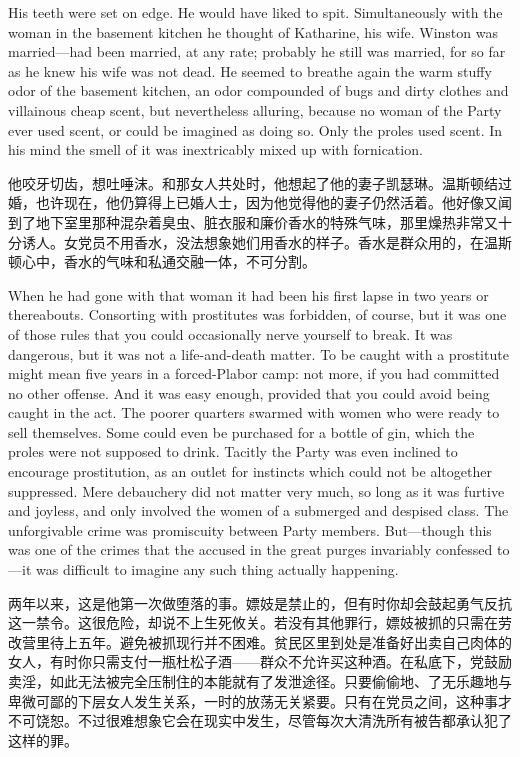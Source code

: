 \begin{paracol}{2}
\switchcolumn*

His teeth were set on edge. He would have liked to spit. Simultaneously
with the woman in the basement kitchen he thought of Katharine, his
wife. Winston was married---had been married, at any rate; probably he
still was married, for so far as he knew his wife was not dead. He
seemed to breathe again the warm stuffy odor of the basement kitchen, an
odor compounded of bugs and dirty clothes and villainous cheap scent,
but nevertheless alluring, because no woman of the Party ever used
scent, or could be imagined as doing so. Only the proles used scent. In
his mind the smell of it was inextricably mixed up with fornication.

\switchcolumn

他咬牙切齿，想吐唾沫。和那女人共处时，他想起了他的妻子凯瑟琳。温斯顿结过婚，也许现在，他仍算得上已婚人士，因为他觉得他的妻子仍然活着。他好像又闻到了地下室里那种混杂着臭虫、脏衣服和廉价香水的特殊气味，那里燥热非常又十分诱人。女党员不用香水，没法想象她们用香水的样子。香水是群众用的，在温斯顿心中，香水的气味和私通交融一体，不可分割。

\switchcolumn*

When he had gone with that woman it had been his first lapse in two
years or thereabouts. Consorting with prostitutes was forbidden, of
course, but it was one of those rules that you could occasionally nerve
yourself to break. It was dangerous, but it was not a life-and-death
matter. To be caught with a prostitute might mean five years in a
forced-Plabor camp: not more, if you had committed no other offense. And
it was easy enough, provided that you could avoid being caught in the
act. The poorer quarters swarmed with women who were ready to sell
themselves. Some could even be purchased for a bottle of gin, which the
proles were not supposed to drink. Tacitly the Party was even inclined
to encourage prostitution, as an outlet for instincts which could not be
altogether suppressed. Mere debauchery did not matter very much, so long
as it was furtive and joyless, and only involved the women of a
submerged and despised class. The unforgivable crime was promiscuity
between Party members. But---though this was one of the crimes that the
accused in the great purges invariably confessed to---it was difficult
to imagine any such thing actually happening.

\switchcolumn

两年以来，这是他第一次做堕落的事。嫖妓是禁止的，但有时你却会鼓起勇气反抗这一禁令。这很危险，却说不上生死攸关。若没有其他罪行，嫖妓被抓的只需在劳改营里待上五年。避免被抓现行并不困难。贫民区里到处是准备好出卖自己肉体的女人，有时你只需支付一瓶杜松子酒——群众不允许买这种酒。在私底下，党鼓励卖淫，如此无法被完全压制住的本能就有了发泄途径。只要偷偷地、了无乐趣地与卑微可鄙的下层女人发生关系，一时的放荡无关紧要。只有在党员之间，这种事才不可饶恕。不过很难想象它会在现实中发生，尽管每次大清洗所有被告都承认犯了这样的罪。


\end{paracol}
